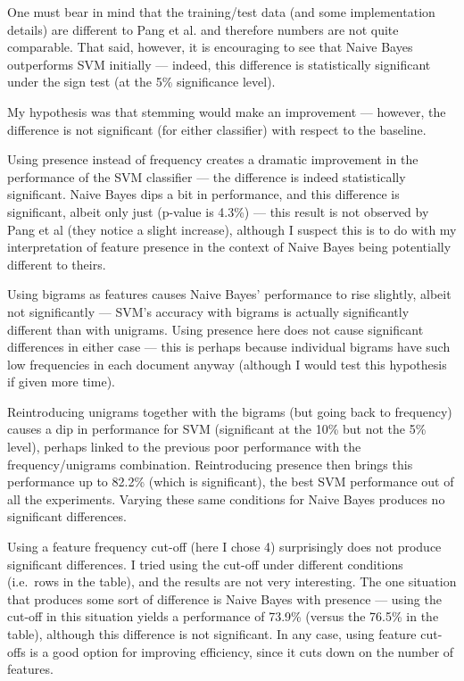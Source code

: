 \documentclass[12pt,a4paper,twoside]{article}
\begin{document}
One must bear in mind that the training/test data (and some implementation details) are different to Pang et al. and therefore numbers are not quite comparable. That said, however, it is encouraging to see that Naive Bayes outperforms SVM initially --- indeed, this difference is statistically significant under the sign test (at the 5\% significance level).

My hypothesis was that stemming would make an improvement --- however, the difference is not significant (for either classifier) with respect to the baseline.

Using presence instead of frequency creates a dramatic improvement in the performance of the SVM classifier --- the difference is indeed statistically significant. Naive Bayes dips a bit in performance, and this difference is significant, albeit only just (p-value is 4.3\%) --- this result is not observed by Pang et al (they notice a slight increase), although I suspect this is to do with my interpretation of feature presence in the context of Naive Bayes being potentially different to theirs.

Using bigrams as features causes Naive Bayes' performance to rise slightly, albeit not significantly --- SVM's accuracy with bigrams is actually significantly different than with unigrams. Using presence here does not cause significant differences in either case --- this is perhaps because individual bigrams have such low frequencies in each document anyway (although I would test this hypothesis if given more time).

Reintroducing unigrams together with the bigrams (but going back to frequency) causes a dip in performance for SVM (significant at the 10\% but not the 5\% level), perhaps linked to the previous poor performance with the frequency/unigrams combination. Reintroducing presence then brings this performance up to 82.2\% (which is significant), the best SVM performance out of all the experiments. Varying these same conditions for Naive Bayes produces no significant differences.

Using a feature frequency cut-off (here I chose 4) surprisingly does not produce significant differences. I tried using the cut-off under different conditions (i.e.\ rows in the table), and the results are not very interesting. The one situation that produces some sort of difference is Naive Bayes with presence --- using the cut-off in this situation yields a performance of 73.9\% (versus the 76.5\% in the table), although this difference is not significant. In any case, using feature cut-offs is a good option for improving efficiency, since it cuts down on the number of features.
\end{document}
